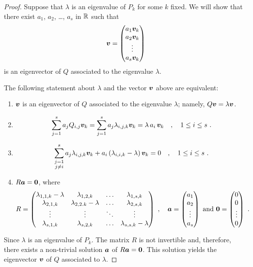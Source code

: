 \begin{proof}
Suppose that $\lambda$ is an eigenvalue of $P_k$ for some $k$ fixed.  We
will show that there exist $a_1$, $a_2$, \ldots, $a_s$ in $\mathbb{R}$ such
that
\[
\bm{v} =
\begin{pmatrix}
a_1 \bm{v}_k \\ a_2 \bm{v}_k \\ \vdots \\ a_s \bm{v}_k
\end{pmatrix}
\]
is an eigenvector of $Q$ associated to the eigenvalue $\lambda$.

The following statement about $\lambda$ and the vector $\bm{v}$ above
are equivalent:
{
\renewcommand{\labelenumi}{\roman{enumi}.}
\begin{enumerate}
\item $\bm{v}$ is an eigenvector of $Q$ associated to the
  eigenvalue $\lambda$; namely, $Q\bm{v} = \lambda \bm{v}$.
\item
\[
\sum_{j=1}^s a_j Q_{i,j}\bm{v}_k =
\sum_{j=1}^s a_j \lambda_{i,j,k}\bm{v}_k = \lambda\, a_i\, \bm{v}_k \quad ,
\quad 1 \leq i \leq s \ .
\]
\item
\[
\sum_{\substack{j=1\\j\neq i}}^s a_j \lambda_{i,j,k}\bm{v}_k +
a_i \left(\lambda_{i,i,k} - \lambda \right) \bm{v}_k = 0 \quad ,
\quad 1 \leq i \leq s \ .
\]
\item $R \bm{a} = \bm{0}$, where
\[
R =
\begin{pmatrix}
\lambda_{1,1,k} -\lambda & \lambda_{1,2,k} & \ldots & \lambda_{1,s,k} \\
\lambda_{2,1,k} & \lambda_{2,2.k}-\lambda & \ldots & \lambda_{2,s,k} \\
\vdots & \vdots & \ddots & \vdots \\
\lambda_{s,1,k} & \lambda_{s,2,k} & \ldots & \lambda_{s,s,k}-\lambda \\
\end{pmatrix} \ , \quad
\VEC{a} =
\begin{pmatrix}
a_1 \\ a_2 \\ \vdots \\ a_s
\end{pmatrix}
\ \text{and} \ 
\VEC{0} =
\begin{pmatrix}
0 \\0 \\ \vdots \\ 0
\end{pmatrix} \ .
\]
\end{enumerate}
}
Since $\lambda$ is an eigenvalue of $P_k$.  The matrix $R$ is not
invertible and, therefore, there exists a non-trivial solution $\bm{a}$
of $R \bm{a} = \bm{0}$.  This solution yields the eigenvector
$\bm{v}$ of $Q$ associated to $\lambda$.
\end{proof}

